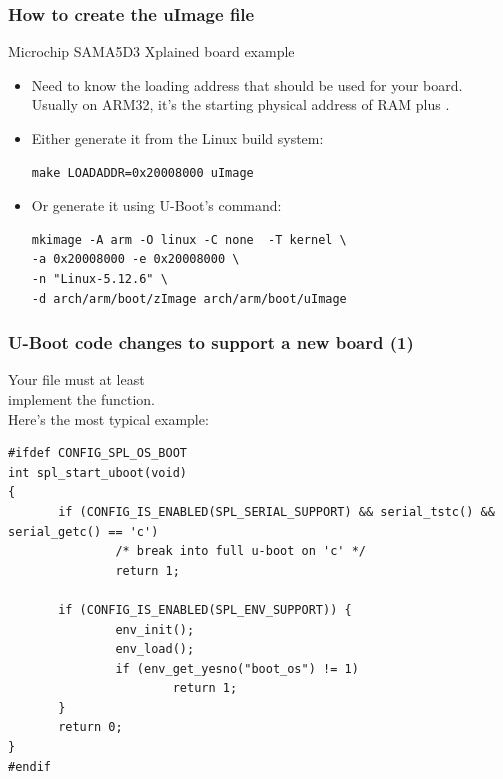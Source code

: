 \begin{frame}[fragile]
   \frametitle{How to create the uImage file}
   Microchip SAMA5D3 Xplained board example
   \begin{itemize}
      \item Need to know the loading address that should be used for
            your board. Usually on ARM32, it's the starting physical address of
	    RAM plus .
      \item Either generate it from the Linux build system:\\
	  \begin{block}{}
	  \begin{verbatim}
make LOADADDR=0x20008000 uImage
          \end{verbatim}
	  \end{block}
      \item Or generate it using U-Boot's  command:\\
	  \begin{block}{}
	  \begin{verbatim}
mkimage -A arm -O linux -C none  -T kernel \
-a 0x20008000 -e 0x20008000 \
-n "Linux-5.12.6" \
-d arch/arm/boot/zImage arch/arm/boot/uImage
          \end{verbatim}
	  \end{block}
   \end{itemize}
\end{frame}

\begin{frame}[fragile]
\frametitle{U-Boot code changes to support a new board (1)}
\small
Your  file must at least\\
implement the \projfunc{u-boot}{spl_start_uboot} function.\\
Here's the most typical example:
\begin{block}{}
\begin{verbatim}
#ifdef CONFIG_SPL_OS_BOOT
int spl_start_uboot(void)
{
       if (CONFIG_IS_ENABLED(SPL_SERIAL_SUPPORT) && serial_tstc() && serial_getc() == 'c')
               /* break into full u-boot on 'c' */
               return 1;

       if (CONFIG_IS_ENABLED(SPL_ENV_SUPPORT)) {
               env_init();
               env_load();
               if (env_get_yesno("boot_os") != 1)
                       return 1;
       }
       return 0;
}
#endif
\end{verbatim}
\end{block}
\end{frame}

